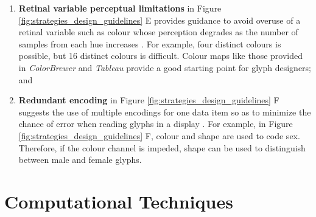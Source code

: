 \begin{enumerate}
\item \textbf{Retinal variable perceptual limitations} in Figure  \ref{fig:strategies_design_guidelines} E provides guidance to avoid overuse of a retinal variable such as colour whose perception degrades as the number of samples from each hue increases \cite{hitt1992retrofit, healey1996choosing, ware13}.
For example, four distinct colours is possible, but 16 distinct colours is difficult.
Colour maps like those provided in \emph{ColorBrewer} \cite{ColorBrewer} and \emph{Tableau} \cite{tableau_palettes} provide a good starting point for glyph designers; and

\item \textbf{Redundant encoding} in Figure \ref{fig:strategies_design_guidelines} F suggests the use of multiple encodings for one data item so as to minimize the chance of error when reading glyphs in a display \cite{ware13}.
For example, in Figure \ref{fig:strategies_design_guidelines} F, colour and shape are used to code sex.
Therefore, if the colour channel is impeded, shape can be used to distinguish between male and female glyphs.
\end{enumerate}

\section{Computational Techniques}

